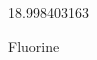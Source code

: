 \documentclass[12pt]{article}
\begin{document}
\hfill{}
\vfill
\begin{center}
  {\fontsize{50}{60}
  }

  18.998403163

Fluorine
\end{center}
\vfill
\end{document}
